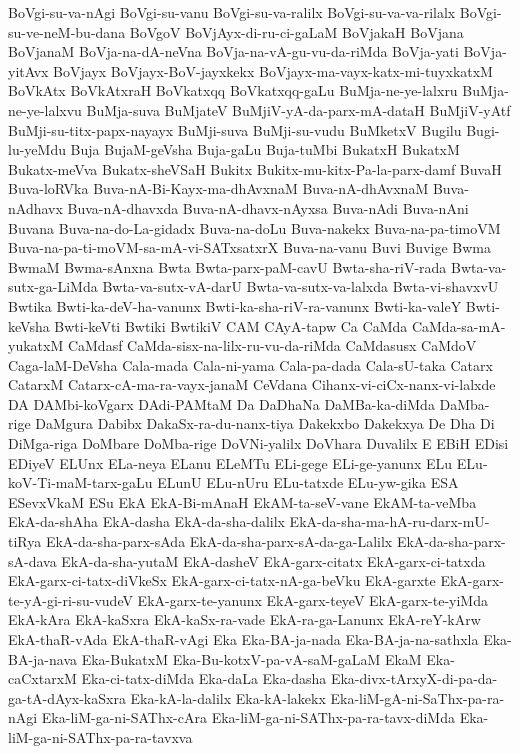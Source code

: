 {BoVgi-su-va-nAgi
BoVgi-su-vanu
BoVgi-su-va-ralilx
BoVgi-su-va-va-rilalx
BoVgi-su-ve-neM-bu-dana
BoVgoV
BoVjAyx-di-ru-ci-gaLaM
BoVjakaH
BoVjana
BoVjanaM
BoVja-na-dA-neVna
BoVja-na-vA-gu-vu-da-riMda
BoVja-yati
BoVja-yitAvx
BoVjayx
BoVjayx-BoV-jayxkekx
BoVjayx-ma-vayx-katx-mi-tuyxkatxM
BoVkAtx
BoVkAtxraH
BoVkatxqq
BoVkatxqq-gaLu
BuMja-ne-ye-lalxru
BuMja-ne-ye-lalxvu
BuMja-suva
BuMjateV
BuMjiV-yA-da-parx-mA-dataH
BuMjiV-yAtf
BuMji-su-titx-papx-nayayx
BuMji-suva
BuMji-su-vudu
BuMketxV
Bugilu
Bugi-lu-yeMdu
Buja
BujaM-geVsha
Buja-gaLu
Buja-tuMbi
BukatxH
BukatxM
Bukatx-meVva
Bukatx-sheVSaH
Bukitx
Bukitx-mu-kitx-Pa-la-parx-damf
BuvaH
Buva-loRVka
Buva-nA-Bi-Kayx-ma-dhAvxnaM
Buva-nA-dhAvxnaM
Buva-nAdhavx
Buva-nA-dhavxda
Buva-nA-dhavx-nAyxsa
Buva-nAdi
Buva-nAni
Buvana
Buva-na-do-La-gidadx
Buva-na-doLu
Buva-nakekx
Buva-na-pa-timoVM
Buva-na-pa-ti-moVM-sa-mA-vi-SATxsatxrX
Buva-na-vanu
Buvi
Buvige
Bwma
BwmaM
Bwma-sAnxna
Bwta
Bwta-parx-paM-cavU
Bwta-sha-riV-rada
Bwta-va-sutx-ga-LiMda
Bwta-va-sutx-vA-darU
Bwta-va-sutx-va-lalxda
Bwta-vi-shavxvU
Bwtika
Bwti-ka-deV-ha-vanunx
Bwti-ka-sha-riV-ra-vanunx
Bwti-ka-valeY
Bwti-keVsha
Bwti-keVti
Bwtiki
BwtikiV
CAM
CAyA-tapw
Ca
CaMda
CaMda-sa-mA-yukatxM
CaMdasf
CaMda-sisx-na-lilx-ru-vu-da-riMda
CaMdasusx
CaMdoV
Caga-laM-DeVsha
Cala-mada
Cala-ni-yama
Cala-pa-dada
Cala-sU-taka
Catarx
CatarxM
Catarx-cA-ma-ra-vayx-janaM
CeVdana
Cihanx-vi-ciCx-nanx-vi-lalxde
DA
DAMbi-koVgarx
DAdi-PAMtaM
Da
DaDhaNa
DaMBa-ka-diMda
DaMba-rige
DaMgura
Dabibx
DakaSx-ra-du-nanx-tiya
Dakekxbo
Dakekxya
De
Dha
Di
DiMga-riga
DoMbare
DoMba-rige
DoVNi-yalilx
DoVhara
Duvalilx
E
EBiH
EDisi
EDiyeV
ELUnx
ELa-neya
ELanu
ELeMTu
ELi-gege
ELi-ge-yanunx
ELu
ELu-koV-Ti-maM-tarx-gaLu
ELunU
ELu-nUru
ELu-tatxde
ELu-yw-gika
ESA
ESevxVkaM
ESu
EkA
EkA-Bi-mAnaH
EkAM-ta-seV-vane
EkAM-ta-veMba
EkA-da-shAha
EkA-dasha
EkA-da-sha-dalilx
EkA-da-sha-ma-hA-ru-darx-mU-tiRya
EkA-da-sha-parx-sAda
EkA-da-sha-parx-sA-da-ga-Lalilx
EkA-da-sha-parx-sA-dava
EkA-da-sha-yutaM
EkA-dasheV
EkA-garx-citatx
EkA-garx-ci-tatxda
EkA-garx-ci-tatx-diVkeSx
EkA-garx-ci-tatx-nA-ga-beVku
EkA-garxte
EkA-garx-te-yA-gi-ri-su-vudeV
EkA-garx-te-yanunx
EkA-garx-teyeV
EkA-garx-te-yiMda
EkA-kAra
EkA-kaSxra
EkA-kaSx-ra-vade
EkA-ra-ga-Lanunx
EkA-reY-kArw
EkA-thaR-vAda
EkA-thaR-vAgi
Eka
Eka-BA-ja-nada
Eka-BA-ja-na-sathxla
Eka-BA-ja-nava
Eka-BukatxM
Eka-Bu-kotxV-pa-vA-saM-gaLaM
EkaM
Eka-caCxtarxM
Eka-ci-tatx-diMda
Eka-daLa
Eka-dasha
Eka-divx-tArxyX-di-pa-da-ga-tA-dAyx-kaSxra
Eka-kA-la-dalilx
Eka-kA-lakekx
Eka-liM-gA-ni-SaThx-pa-ra-nAgi
Eka-liM-ga-ni-SAThx-cAra
Eka-liM-ga-ni-SAThx-pa-ra-tavx-diMda
Eka-liM-ga-ni-SAThx-pa-ra-tavxva
}

